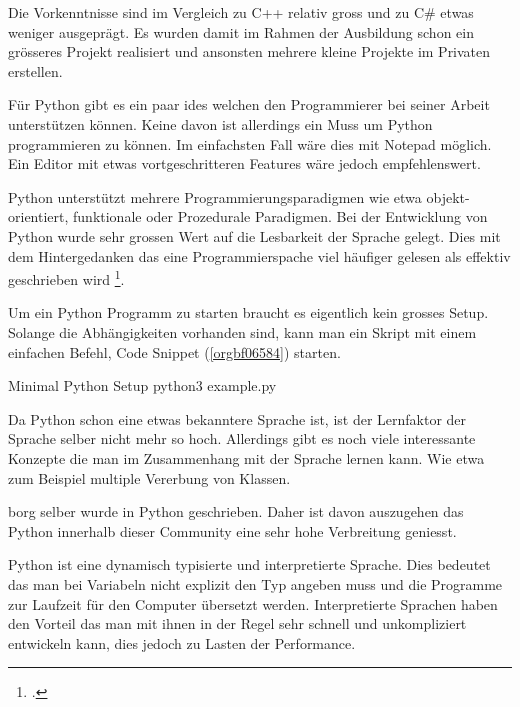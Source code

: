 Die Vorkenntnisse sind im Vergleich zu C++ relativ gross und zu C\# etwas
weniger ausgeprägt. Es wurden damit im Rahmen der Ausbildung schon ein
grösseres Projekt realisiert und ansonsten mehrere kleine Projekte im Privaten
erstellen.

Für Python gibt es ein paar \glspl{ide} welchen den Programmierer bei seiner
Arbeit unterstützen können. Keine davon ist allerdings ein Muss um Python
programmieren zu können. Im einfachsten Fall wäre dies mit Notepad möglich. Ein
Editor mit etwas vortgeschritteren Features wäre jedoch empfehlenswert.

Python unterstützt mehrere Programmierungsparadigmen wie etwa
objekt-orientiert, funktionale oder Prozedurale Paradigmen. Bei der Entwicklung
von Python wurde sehr grossen Wert auf die Lesbarkeit der Sprache gelegt. Dies
mit dem Hintergedanken das eine Programmierspache viel häufiger gelesen als
effektiv geschrieben wird \footcite{pep8}.

Um ein Python Programm zu starten braucht es eigentlich kein grosses Setup.
Solange die Abhängigkeiten vorhanden sind, kann man ein Skript mit einem
einfachen Befehl, Code Snippet (\ref{orgbf06584}) starten.

\begin{sexylisting}{Minimal Python Setup}
python3 example.py
\end{sexylisting}

Da Python schon eine etwas bekanntere Sprache ist, ist der Lernfaktor der
Sprache selber nicht mehr so hoch. Allerdings gibt es noch viele interessante
Konzepte die man im Zusammenhang mit der Sprache lernen kann. Wie etwa zum
Beispiel multiple Vererbung von Klassen.

\gls{borg} selber wurde in Python geschrieben. Daher ist davon auszugehen das
Python innerhalb dieser Community eine sehr hohe Verbreitung geniesst.

Python ist eine dynamisch typisierte und interpretierte Sprache. Dies bedeutet
das man bei Variabeln nicht explizit den Typ angeben muss und die Programme zur
Laufzeit für den Computer übersetzt werden. Interpretierte Sprachen haben den
Vorteil das man mit ihnen in der Regel sehr schnell und unkompliziert
entwickeln kann, dies jedoch zu Lasten der Performance.

